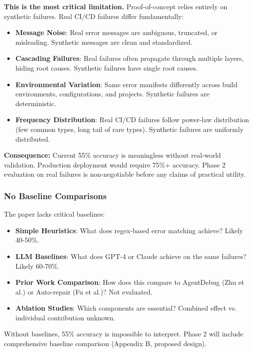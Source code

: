 \documentclass[11pt]{article}
\begin{document}
\textbf{This is the most critical limitation.} Proof-of-concept relies entirely on synthetic failures. Real CI/CD failures differ fundamentally:

\begin{itemize}
    \item \textbf{Message Noise}: Real error messages are ambiguous, truncated, or misleading. Synthetic messages are clean and standardized.
    \item \textbf{Cascading Failures}: Real failures often propagate through multiple layers, hiding root causes. Synthetic failures have single root causes.
    \item \textbf{Environmental Variation}: Same error manifests differently across build environments, configurations, and projects. Synthetic failures are deterministic.
    \item \textbf{Frequency Distribution}: Real CI/CD failures follow power-law distribution (few common types, long tail of rare types). Synthetic failures are uniformly distributed.
\end{itemize}

\textbf{Consequence:} Current 55\% accuracy is meaningless without real-world validation. Production deployment would require 75\%+ accuracy. Phase 2 evaluation on real failures is non-negotiable before any claims of practical utility.

\subsubsection{No Baseline Comparisons}

The paper lacks critical baselines:

\begin{itemize}
    \item \textbf{Simple Heuristics}: What does regex-based error matching achieve? Likely 40-50\%.
    \item \textbf{LLM Baselines}: What does GPT-4 or Claude achieve on the same failures? Likely 60-70\%.
    \item \textbf{Prior Work Comparison}: How does this compare to AgentDebug (Zhu et al.) or Auto-repair (Fu et al.)? Not evaluated.
    \item \textbf{Ablation Studies}: Which components are essential? Combined effect vs. individual contribution unknown.
\end{itemize}

Without baselines, 55\% accuracy is impossible to interpret. Phase 2 will include comprehensive baseline comparison (Appendix B, proposed design).
\end{document}
